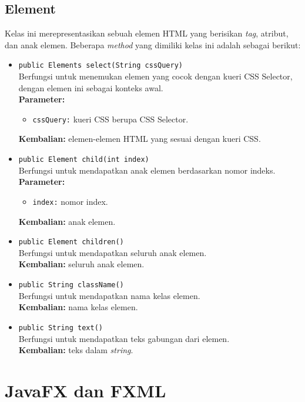 \subsection{Element}
Kelas ini merepresentasikan sebuah elemen HTML yang berisikan \textit{tag}, atribut, dan anak elemen. Beberapa \textit{method} yang dimiliki kelas ini adalah sebagai berikut:
\begin{itemize}
    	\item \texttt{public Elements select(String cssQuery)} \\
		Berfungsi untuk menemukan elemen yang cocok dengan kueri CSS Selector, dengan elemen ini sebagai konteks awal. \\
		\textbf{Parameter:} 
		\begin{itemize}
			\item \texttt{cssQuery:} kueri CSS berupa CSS Selector.
		\end{itemize}
		\textbf{Kembalian:} elemen-elemen HTML yang sesuai dengan kueri CSS.	

    	\item \texttt{public Element child(int index)} \\
		Berfungsi untuk mendapatkan anak elemen berdasarkan nomor indeks. \\
		\textbf{Parameter:} 
		\begin{itemize}
			\item \texttt{index:} nomor index.
		\end{itemize}
		\textbf{Kembalian:} anak elemen.	
		
		\item \texttt{public Element children()} \\
		Berfungsi untuk mendapatkan seluruh anak elemen. \\
		\textbf{Kembalian:} seluruh anak elemen.	
		
		\item \texttt{public String className()} \\
		Berfungsi untuk mendapatkan nama kelas elemen. \\
		\textbf{Kembalian:} nama kelas elemen.	
		
		\item \texttt{public String text()} \\
		Berfungsi untuk mendapatkan teks gabungan dari elemen. \\
		\textbf{Kembalian:} teks dalam \textit{string}.	
\end{itemize}

\section{JavaFX dan FXML}
